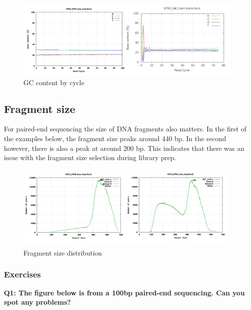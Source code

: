 \documentclass[11pt]{article}
\begin{document}
    \begin{figure}[!h]
\centering
\includegraphics{img/acgt_per_cycle_comparison.png}
\caption{GC content by cycle}
\end{figure}

\pagebreak

    \hypertarget{fragment-size}{%
\subsection{Fragment size}\label{fragment-size}}

For paired-end sequencing the size of DNA fragments also matters. In the
first of the examples below, the fragment size peaks around 440 bp. In
the second however, there is also a peak at around 200 bp. This
indicates that there was an issue with the fragment size selection
during library prep.

    \begin{figure}[!h]
\centering
\includegraphics{img/fragment_size_comparison.png}
\caption{Fragment size distribution}
\end{figure}

    \hypertarget{exercises}{%
\subsubsection{Exercises}\label{exercises}}

\textbf{Q1: The figure below is from a 100bp paired-end sequencing. Can
you spot any problems?}
\end{document}
